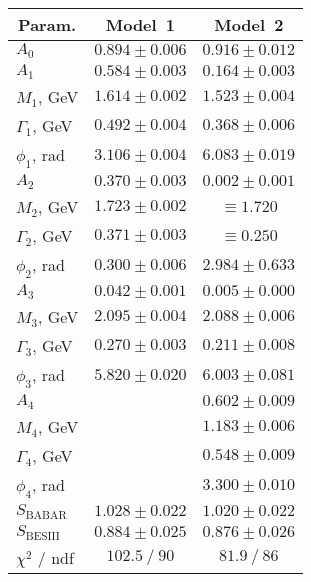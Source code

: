 \begin{tabular}{lcc}
\multicolumn{1}{c}{Param.} & \multicolumn{1}{c}{Model~1} & \multicolumn{1}{c}{Model~2} \\ \hline
$A_{0}$ & $0.894 \pm 0.006$ & $0.916 \pm 0.012$ \\
$A_{1}$ & $0.584 \pm 0.003$ & $0.164 \pm 0.003$ \\
$M_{1}$, GeV & $1.614 \pm 0.002$ & $1.523 \pm 0.004$ \\
$\Gamma_{1}$, GeV & $0.492 \pm 0.004$ & $0.368 \pm 0.006$ \\
$\phi_{1}$, rad & $3.106 \pm 0.004$ & $6.083 \pm 0.019$ \\
$A_{2}$ & $0.370 \pm 0.003$ & $0.002 \pm 0.001$ \\
$M_{2}$, GeV & $1.723 \pm 0.002$ & $\equiv 1.720$ \\
$\Gamma_{2}$, GeV & $0.371 \pm 0.003$ & $\equiv 0.250$ \\
$\phi_{2}$, rad & $0.300 \pm 0.006$ & $2.984 \pm 0.633$ \\
$A_{3}$ & $0.042 \pm 0.001$ & $0.005 \pm 0.000$ \\
$M_{3}$, GeV & $2.095 \pm 0.004$ & $2.088 \pm 0.006$ \\
$\Gamma_{3}$, GeV & $0.270 \pm 0.003$ & $0.211 \pm 0.008$ \\
$\phi_{3}$, rad & $5.820 \pm 0.020$ & $6.003 \pm 0.081$ \\
$A_{4}$ &  & $0.602 \pm 0.009$ \\
$M_{4}$, GeV &  & $1.183 \pm 0.006$ \\
$\Gamma_{4}$, GeV &  & $0.548 \pm 0.009$ \\
$\phi_{4}$, rad &  & $3.300 \pm 0.010$ \\
$S_\text{BABAR}$ & $1.028 \pm 0.022$ & $1.020 \pm 0.022$ \\
$S_\text{BESIII}$ & $0.884 \pm 0.025$ & $0.876 \pm 0.026$ \\
$\chi^2$ / ndf & $102.5\ /\ 90$ & $81.9\ /\ 86$ \\
\end{tabular}
